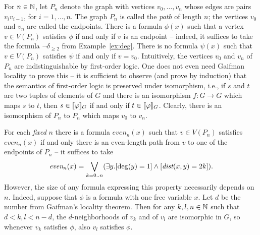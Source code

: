 \begin{example}
	For $n\in\mathbb{N}$, let $P_n$ denote the graph with vertices $v_0,\ldots,v_n$ whose edges are pairs $v_{i}v_{i-1}$, for $i=1,\ldots,{n}$. 
	The graph $P_n$ is called the \emph{path} of length $n$; the vertices $v_0$ and $v_n$ are called the endpoints. There is a formula $\phi(x)$ such that a vertex $v\in V(P_n)$ satisfies $\phi$ if and only if $v$ is an endpoint -- indeed, it suffices to take the formula $\neg\delta_{\ge 2}$ from Example~\ref{ex:deg}. There is no formula $\psi(x)$
	such that $v\in V(P_n)$ satisfies $\psi$ if and only if $v=v_0$. Intuitively, the vertices $v_0$ and $v_n$
	of $P_n$ are indistinguishable by first-order logic. One does not even need Gaifman locality to prove this -- it is sufficient to
	 observe (and prove by induction)  that the semantics of first-order logic is preserved under isomorphism, i.e., if $s$
	and $t$ are two tuples of elements of $G$ and there is an isomorphism $f:G\to G$ which maps $s$ to $t$, then $s\in [\![\varphi]\!]_G$
	if and only if $t\in [\![\varphi]\!]_G$. Clearly, there is an isomorphism of $P_n$ to $P_n$ which maps $v_0$ to $v_n$.
	
		
	
	
	For each \emph{fixed} $n$  there is a formula $\textit{even}_n(x)$ such that $v\in V(P_n)$ satisfies $\textit{even}_n(x)$ if and only there is an even-length path from $v$ to one of the endpoints of $P_n$ -- it suffices to take $$\textit{even}_n(x)=	
	\bigvee_{k=0..n}
	(\exists y.
	[\deg(y)=1]\land
	[\textit{dist}(x,y)=2k]).$$
	However, the size of any  formula expressing this property necessarily depends on $n$.
	Indeed, suppose that  $\phi$ is a formula with one free variable $x$.
	 Let $d$ be the number from Gaifman's locality theorem. 
	 Then for any $k,l,n\in \mathbb{N}$ such that $d< k,l< n-d$,
	 the $d$-neighborhoods of $v_k$ and of $v_l$
	 are isomorphic in $G$, so	 
	 whenever $v_k$ satisfies $\phi$, 
	 also $v_l$ satisfies $\phi$.
\end{example}



